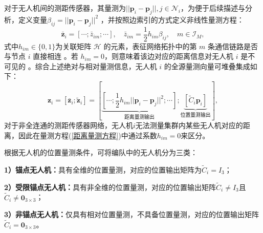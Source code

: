 对于无人机间的测距传感器，其量测为$ ||{\mathbf{p}}_i-{\mathbf{p}}_j||,j \in \mathcal{N}_i $，为便于后续描述与分析，定义变量$\beta_{ij}=||{\mathbf{p}}_i-{\mathbf{p}}_j||^2 $ ，并按照边索引的方式定义非线性量测方程：
\begin{equation}
	\bar{\mathbf{z}}_i=[\cdots; \bar{z}_{im}; \cdots],
	\quad 
	\bar{z}_{im}=\frac{1}{2} h_{im} \beta_{ij}, 
	\quad
	m \in \mathcal{I}_{M},
	\label{距离量测方程}
\end{equation}
式中$ h_{im} \in \{0,1\} $为关联矩阵 $ \mathcal{H} $ 的元素，表征网络拓扑中的第 $m$ 条通信链路是否与节点 $i$ 直接相连 。若 $h_{im}=0$，则意味着该边对应的距离信息对无人机 $i$ 是不可见的 。综合上述绝对与相对量测信息，无人机 $i$ 的全源量测向量可堆叠集成如下：
\begin{equation}
	\mathbf{z}_i = [\bar{\mathbf{z}}_i;\tilde{\mathbf{z}}_i] = 
	\left[
		\underbrace{
			\left[
			\cdots; 
			\frac{1}{2} h_{im} ||{\mathbf{p}}_i-{\mathbf{p}}_j||^2;
			\cdots
			\right]
		}_{\text{距离量测输出}};
		\underbrace{
			\left[
			\tilde{C}_i \mathbf{p}_i
			\right]
		}_{\text{位置量测输出}}
	\right],
\end{equation}
对于非全连通的测距传感器网络，无人机$i$无法测量集群内某些无人机对应的距离，因此在量测方程(\ref{距离量测方程})中通过系数$ h_{im} = 0 $来区分。

根据无人机的位置量测条件，可将编队中的无人机分为三类：

\textbf{1）锚点无人机：}具有全维的位置量测，对应的位置输出矩阵为$\tilde{C}_i = I_3$；

\textbf{2）受限锚点无人机：}具有非全维的位置量测，对应的位置输出矩阵$\tilde{C}_i \neq I_3$且$\tilde{C}_i \neq \mathbf{0}_{3 \times 3}$；

\textbf{3）非锚点无人机：}仅具有相对位置量测，不具备位置量测，对应的位置输出矩阵$\tilde{C}_i=\mathbf{0}_{3 \times 3}$。

